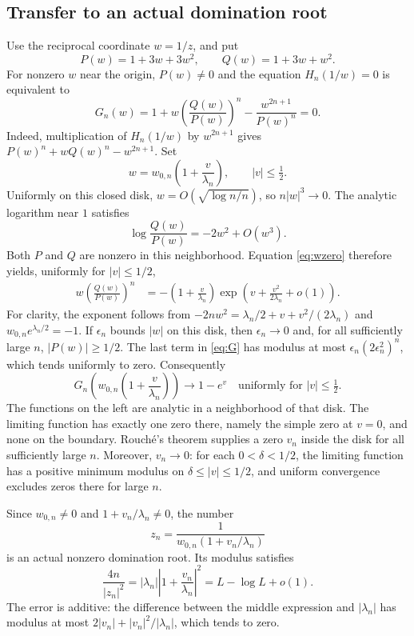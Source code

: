 \documentclass[11pt,a4paper]{article}
\begin{document}
\subsection{Transfer to an actual domination root}
Use the reciprocal coordinate $w=1/z$, and put
\[
 P(w)=1+3w+3w^2,\qquad Q(w)=1+3w+w^2.
\]
For nonzero $w$ near the origin, $P(w)\ne0$ and the equation $H_n(1/w)=0$
is equivalent to
\begin{equation}\label{eq:G}
 G_n(w)=1+w\left(\frac{Q(w)}{P(w)}\right)^n
       -\frac{w^{2n+1}}{P(w)^n}=0.
\end{equation}
Indeed, multiplication of $H_n(1/w)$ by $w^{2n+1}$ gives
$P(w)^n+wQ(w)^n-w^{2n+1}$.
Set
\[
 w=w_{0,n}\left(1+\frac v{\lambda_n}\right),\qquad |v|\le\tfrac12.
\]
Uniformly on this closed disk, $w=O(\sqrt{\log n/n})$, so $n|w|^3\to0$.
The analytic logarithm near $1$ satisfies
\[
 \log\frac{Q(w)}{P(w)}=-2w^2+O(w^3).
\]
Both $P$ and $Q$ are nonzero in this neighborhood. Equation \eqref{eq:wzero}
therefore yields, uniformly for $|v|\le1/2$,
\begin{align*}
 w\left(\frac{Q(w)}{P(w)}\right)^n
 &=-\left(1+\frac v{\lambda_n}\right)
   \exp\left(v+\frac{v^2}{2\lambda_n}+o(1)\right).
\end{align*}
For clarity, the exponent follows from
$-2nw^2=\lambda_n/2+v+v^2/(2\lambda_n)$ and
$w_{0,n}e^{\lambda_n/2}=-1$.
If $\epsilon_n$ bounds $|w|$ on this disk, then $\epsilon_n\to0$ and,
for all sufficiently large $n$, $|P(w)|\ge1/2$. The last term in \eqref{eq:G}
has modulus at most $\epsilon_n(2\epsilon_n^2)^n$, which tends uniformly to zero.
Consequently
\begin{equation}\label{eq:limit}
 G_n\left(w_{0,n}\left(1+\frac v{\lambda_n}\right)\right)
 \longrightarrow1-e^v
 \quad\text{uniformly for }|v|\le\tfrac12.
\end{equation}
The functions on the left are analytic in a neighborhood of that disk.
The limiting function has exactly one zero there, namely the simple zero at
$v=0$, and none on the boundary. Rouch\'e's theorem supplies a zero $v_n$
inside the disk for all sufficiently large $n$.
Moreover, $v_n\to0$: for each $0<\delta<1/2$, the limiting function has a positive
minimum modulus on $\delta\le|v|\le1/2$, and uniform convergence excludes
zeros there for large $n$.

Since $w_{0,n}\ne0$ and $1+v_n/\lambda_n\ne0$, the number
\[
 z_n=\frac1{w_{0,n}(1+v_n/\lambda_n)}
\]
is an actual nonzero domination root. Its modulus satisfies
\begin{equation}\label{eq:constructed}
 \frac{4n}{|z_n|^2}
 =|\lambda_n|\left|1+\frac{v_n}{\lambda_n}\right|^2
 =L-\log L+o(1).
\end{equation}
The error is additive: the difference between the middle expression and
$|\lambda_n|$ has modulus at most $2|v_n|+|v_n|^2/|\lambda_n|$, which tends to zero.
\end{document}
